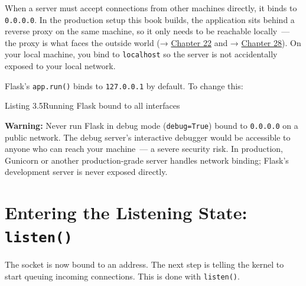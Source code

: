 \noindent{}When a server must accept connections from other machines directly, it binds to \texttt{0.0.0.0}. In the production setup this book builds, the application sits behind a reverse proxy on the same machine, so it only needs to be reachable locally~--- the proxy is what faces the outside world (→ \hyperref[ch:22-network-configuration]{Chapter 22} and → \hyperref[ch:28-traffic-routing]{Chapter 28}). On your local machine, you bind to \texttt{localhost} so the server is not accidentally exposed to your local network.

Flask's \texttt{app.run()} binds to \texttt{127.0.0.1} by default. To change this:

\begin{codeboxcap}[short]{\textcolor{accent}{Listing 3.5}\enspace Running Flask bound to all interfaces}

\begin{Shaded}
\begin{Highlighting}[]
  \OperatorTok{==} \NormalTok{:}
\OperatorTok{=}\OperatorTok{=}\OperatorTok{=}\NormalTok{)}
\end{Highlighting}
\end{Shaded}

\end{codeboxcap}

\begin{warnbox}

\textbf{Warning:} Never run Flask in debug mode (\texttt{debug=True}) bound to \texttt{0.0.0.0} on a public network. The debug server's interactive debugger would be accessible to anyone who can reach your machine~--- a severe security risk. In production, Gunicorn or another production-grade server handles network binding; Flask's development server is never exposed directly.

\end{warnbox}

\setcounter{section}{3}
\section{\texorpdfstring{Entering the Listening State: \texttt{listen()}}{Entering the Listening State: listen()}}\label{03-network-capability:34-entering-the-listening-state-listen}

The socket is now bound to an address. The next step is telling the kernel to start queuing incoming connections. This is done with \texttt{listen()}.

